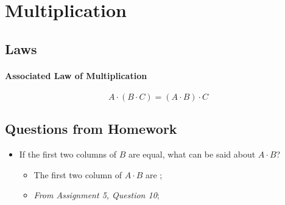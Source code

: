 \section{Multiplication}

  \subsection{Laws}
    
    \paragraph{Associated Law of Multiplication}
    \begin{equation}
      A \cdot \left( B \cdot C \right) = \left( A \cdot B \right) \cdot C
    \end{equation}
    
  \subsection{Questions from Homework}
    
    \begin{itemize}
      \item If the first two columns of $ B $ are equal, what can be said
      about $ A \cdot B $?
      \begin{itemize}
        \item The first two column of $ A \cdot B $ are ;
        
        \item \textit{From Assignment 5, Question 10};
      \end{itemize}
      
    \end{itemize}